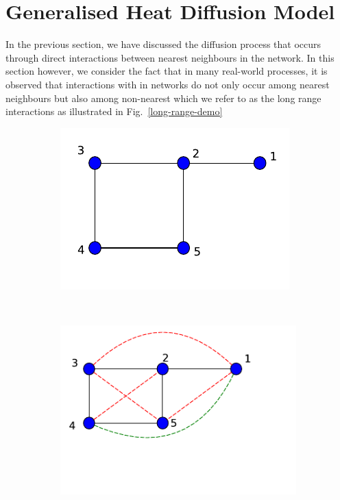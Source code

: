 \documentclass[12pt]{article}
\begin{document}
\section{Generalised Heat Diffusion Model}
In the previous section, we have discussed the diffusion process that occurs through direct interactions between nearest neighbours in the network. In this section however, we consider the fact that in many real-world processes, it is observed that interactions with in networks do not only occur among nearest neighbours but also among non-nearest which we refer to as the long range interactions as illustrated in Fig.~\ref{long-range-demo}

\begin{figure}[H]
	\centering
	\begin{subfigure}[b]{0.3\textwidth}
		\includegraphics[width=\textwidth]{images/kenel-toymodel.pdf}
		\caption{}
		\label{toymodel}
	\end{subfigure}~
	\begin{subfigure}[b]{0.3\textwidth}
		\includegraphics[width= \textwidth]{images/graph-longrange-demo.pdf}

\end{subfigure}
\end{figure}
\end{document}
